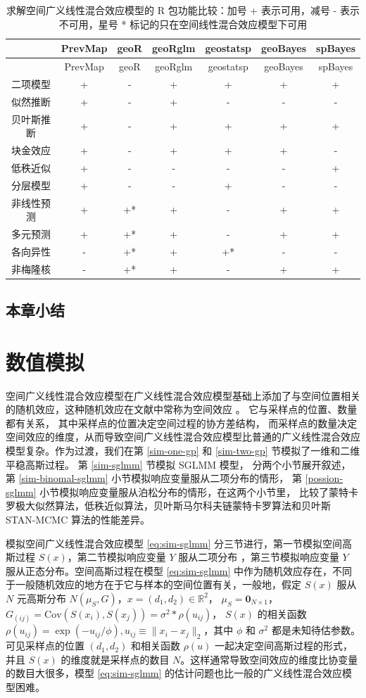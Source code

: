 \documentclass[12pt,a4paper,UTF8,twoside]{book}
\theoremstyle{definition}
\theoremstyle{definition}
\theoremstyle{definition}
\theoremstyle{remark}
\begin{document}
\begin{longtable}[]{@{}ccccccc@{}}
\caption{\label{tab:sglmm-packages} 求解空间广义线性混合效应模型的 R
包功能比较：加号 + 表示可用，减号 - 表示不可用，星号 *
标记的只在空间线性混合效应模型下可用}\tabularnewline
\toprule
& PrevMap & geoR & geoRglm & geostatsp & geoBayes &
spBayes\tabularnewline
\midrule
\endfirsthead
\toprule
& PrevMap & geoR & geoRglm & geostatsp & geoBayes &
spBayes\tabularnewline
\midrule
\endhead
二项模型 & + & - & + & + & + & +\tabularnewline
似然推断 & + & - & + & - & - & -\tabularnewline
贝叶斯推断 & + & - & + & + & + & +\tabularnewline
块金效应 & + & - & + & + & + & -\tabularnewline
低秩近似 & + & - & - & - & - & +\tabularnewline
分层模型 & + & - & - & + & - & -\tabularnewline
非线性预测 & + & +* & + & - & + & +\tabularnewline
多元预测 & + & +* & + & - & + & +\tabularnewline
各向异性 & - & +* & + & +* & - & -\tabularnewline
非梅隆核 & - & +* & + & - & + & +\tabularnewline
\bottomrule
\end{longtable}

\hypertarget{sec:estimations}{%
\section{本章小结}\label{sec:estimations}}

\hypertarget{simulations}{%
\chapter{数值模拟}\label{simulations}}

空间广义线性混合效应模型在广义线性混合效应模型基础上添加了与空间位置相关的随机效应，这种随机效应在文献中常称为空间效应
\citep{Diggle1998}。 它与采样点的位置、数量都有关系，
其中采样点的位置决定空间过程的协方差结构，
而采样点的数量决定空间效应的维度，从而导致空间广义线性混合效应模型比普通的广义线性混合效应模型复杂。作为过渡，我们在第
\ref{sim-one-gp} 和 \ref{sim-two-gp} 节模拟了一维和二维平稳高斯过程。 第
\ref{sim-sglmm} 节模拟 SGLMM 模型， 分两个小节展开叙述，第
\ref{sim-binomal-sglmm} 小节模拟响应变量服从二项分布的情形， 第
\ref{possion-sglmm} 小节模拟响应变量服从泊松分布的情形，在这两个小节里，
比较了蒙特卡罗极大似然算法，低秩近似算法，贝叶斯马尔科夫链蒙特卡罗算法和贝叶斯
STAN-MCMC 算法的性能差异。

模拟空间广义线性混合效应模型 \eqref{eq:sim-sglmm}
分三节进行，第一节模拟空间高斯过程 \(S(x)\)，第二节模拟响应变量 \(Y\)
服从二项分布 ，第三节模拟响应变量 \(Y\) 服从正态分布。空间高斯过程在模型
\eqref{eq:sim-sglmm}
中作为随机效应存在，不同于一般随机效应的地方在于它与样本的空间位置有关，一般地，假定
\(S(x)\) 服从 \(N\) 元高斯分布
\(N(\mu_{S},G)\)，\(x = (d_1,d_2) \in \mathbb{R}^2\)，
\(\mu_{S} = \mathbf{0}_{N\times1}\)，
\(G_{(ij)} = \mathrm{Cov}(S(x_i),S(x_j))=\sigma^2*\rho(u_{ij})\)，
\(S(x)\) 的相关函数
\(\rho(u_{ij}) = \exp(-u_{ij}/\phi), u_{ij} \equiv \|x_{i}-x_{j}\|_2\)，其中
\(\phi\) 和 \(\sigma^2\) 都是未知待估参数。可见采样点的位置
\((d_1,d_2)\) 和相关函数 \(\rho(u)\) 一起决定空间高斯过程的形式，并且
\(S(x)\) 的维度就是采样点的数目
\(N\)。这样通常导致空间效应的维度比协变量的数目大很多，模型
\eqref{eq:sim-sglmm} 的估计问题也比一般的广义线性混合效应模型困难。
\end{document}
